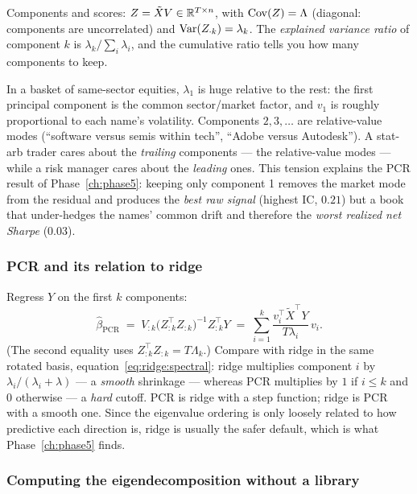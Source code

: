 Components and scores: $Z=\tilde X V\in\mathbb{R}^{T\times n}$, with
$\operatorname{Cov}(Z)=\Lambda$ (diagonal: components are uncorrelated) and
$\operatorname{Var}(Z_{\cdot k})=\lambda_k$. The \emph{explained variance ratio} of component $k$ is
$\lambda_k/\sum_i\lambda_i$, and the cumulative ratio tells you how many components to
keep.

\begin{intuition}
In a basket of same-sector equities, $\lambda_1$ is huge relative to the rest: the first
principal component is the common sector/market factor, and $v_1$ is roughly proportional
to each name's volatility. Components $2,3,\dots$ are relative-value modes (``software
versus semis within tech'', ``Adobe versus Autodesk''). A stat-arb trader cares about the
\emph{trailing} components --- the relative-value modes --- while a risk manager cares
about the \emph{leading} ones. This tension explains the PCR result of
Phase~\ref{ch:phase5}: keeping only component 1 removes the market mode from the residual
and produces the \emph{best raw signal} (highest IC, $0.21$) but a book that under-hedges
the names' common drift and therefore the \emph{worst realized net Sharpe} ($0.03$).
\end{intuition}

\subsubsection{PCR and its relation to ridge}

Regress $Y$ on the first $k$ components:
\begin{equation}
  \hat\beta_{\text{PCR}} \;=\; V_{:k}\bigl(Z_{:k}^{\top}Z_{:k}\bigr)^{-1}Z_{:k}^{\top}Y
  \;=\; \sum_{i=1}^{k}\frac{v_i^{\top}\tilde X^{\top}Y}{T\lambda_i}\,v_i .
  \label{eq:pcr}
\end{equation}
(The second equality uses $Z_{:k}^{\top}Z_{:k}=T\Lambda_k$.) Compare with ridge in the
same rotated basis, equation~\eqref{eq:ridge:spectral}: ridge multiplies component $i$ by
$\lambda_i/(\lambda_i+\lambda)$ --- a \emph{smooth} shrinkage --- whereas PCR multiplies
by $1$ if $i\le k$ and $0$ otherwise --- a \emph{hard} cutoff. PCR is ridge with a step
function; ridge is PCR with a smooth one. Since the eigenvalue ordering is only loosely
related to how predictive each direction is, ridge is usually the safer default, which is
what Phase~\ref{ch:phase5} finds.

\subsubsection{Computing the eigendecomposition without a library}
\label{sec:pca:jacobi}

